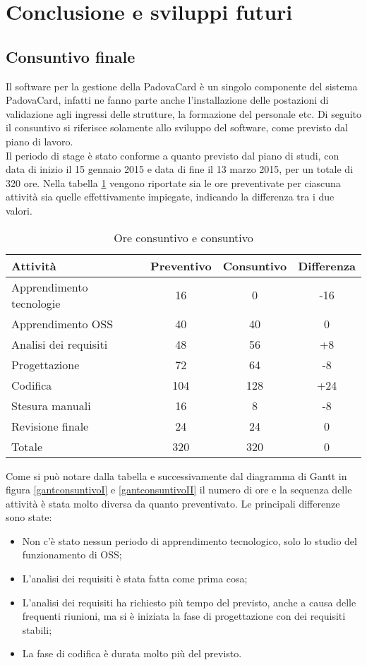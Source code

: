 \section{Conclusione e sviluppi futuri}
\subsection{Consuntivo finale}\label{consuntivo}
Il software per la gestione della PadovaCard è un singolo componente del sistema PadovaCard, infatti ne fanno parte anche l'installazione delle postazioni di validazione agli ingressi delle strutture, la formazione del personale etc. Di seguito il consuntivo si riferisce solamente allo sviluppo del software, come previsto dal piano di lavoro. \\ 

Il periodo di stage è stato conforme a quanto previsto dal piano di studi, con data di inizio il 15 gennaio 2015 e data di fine il 13 marzo 2015, per un totale di 320 ore.
Nella tabella \ref{tabellaconsuntivo} vengono riportate sia le ore preventivate per ciascuna attività sia quelle effettivamente impiegate, indicando la differenza tra i due valori.

\def\arraystretch{2}
\begin{table}[ht]
\centering
\begin{tabular}{|l|c|c|c|}
\hline
Attività & Preventivo & Consuntivo & Differenza \\ \hline
Apprendimento tecnologie & 16 & 0 & -16 \\ \hline
Apprendimento OSS & 40 & 40 & 0 \\ \hline
Analisi dei requisiti & 48 & 56 & +8 \\ \hline
Progettazione & 72 & 64 & -8 \\ \hline
Codifica & 104 & 128 & +24 \\ \hline
Stesura manuali & 16 & 8 & -8 \\ \hline
Revisione finale & 24 & 24 & 0 \\ \hline
Totale & 320 & 320 & 0 \\ \hline
\end{tabular}
\caption{Ore consuntivo e consuntivo \label{tabellaconsuntivo}}
\end{table}
Come si può notare dalla tabella e successivamente dal diagramma di Gantt in figura \ref{gantconsuntivoI} e \ref{gantconsuntivoII} il numero di ore e la sequenza delle attività è stata molto diversa da quanto preventivato. Le principali differenze sono state:
\begin{itemize}
\item Non c'è stato nessun periodo di apprendimento tecnologico, solo lo studio del funzionamento di OSS;
\item L'analisi dei requisiti è stata fatta come prima cosa;
\item L'analisi dei requisiti ha richiesto più tempo del previsto, anche a causa delle frequenti riunioni, ma si è iniziata la fase di progettazione con dei requisiti stabili;
\item La fase di codifica è durata molto più del previsto.
\end{itemize}


